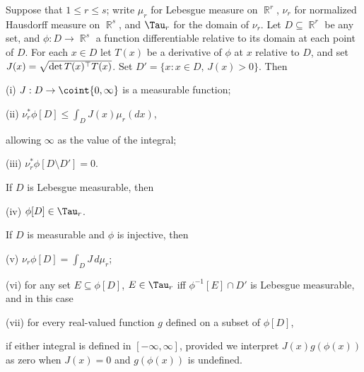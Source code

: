  Suppose that $1\le r\le s$;  write $\mu_r$ for
Lebesgue measure on $\BbbR^r$, $\nu_r$ for normalized Hausdorff
measure on $\BbbR^s$, and $\Tau_r$ for the domain of $\nu_r$.   Let
$D\subseteq\BbbR^r$ be any set, and
$\phi:D\to\BbbR^s$ a function differentiable relative to its domain at
each point of $D$.   For each $x\in D$ let $T(x)$ be a derivative of
$\phi$ at $x$ relative to $D$, and set $J(x)=\sqrt{\det T(x)^{\top} T(x)}$.
Set $D'=\{x:x\in D,\,J(x)>0\}$.   Then

\quad (i) $J:D\to\coint{0,\infty}$ is a measurable function;

\quad (ii) $\nu_r^*\phi[D]\le\int_DJ(x)\mu_r(dx)$,

\noindent allowing $\infty$ as the value of the integral;

\quad (iii) $\nu_r^*\phi[D\setminus D']=0$.

\noindent If $D$ is Lebesgue measurable, then

\quad (iv) $\phi[D]\in\Tau_r$.

\noindent If $D$ is measurable and $\phi$ is injective, then

\quad (v) $\nu_r\phi[D]=\int_DJ\,d\mu_r$;

\quad (vi) for any set $E\subseteq\phi[D]$, $E\in\Tau_r$
iff $\phi^{-1}[E]\cap D'$ is  Lebesgue measurable, and in this case


\quad (vii) for every real-valued function $g$ defined on a subset of
$\phi[D]$,


\noindent if either integral is defined in $[-\infty,\infty]$,
provided
we interpret $J(x)g(\phi(x))$ as zero when $J(x)=0$ and $g(\phi(x))$
is undefined.

